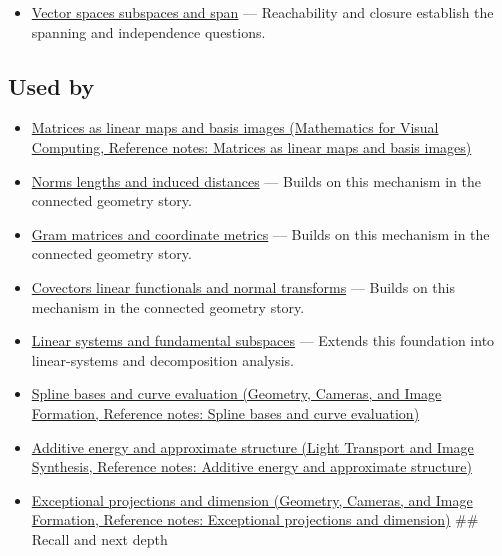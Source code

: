 \begin{itemize}
\tightlist
\item
  \hyperref[appendix-173b52c063ae]{Vector spaces subspaces and span} --- Reachability and closure establish the spanning and independence questions.
\end{itemize}

\subsection{Used by}\label{appendix-ce0341f7ea0d-used-by}

\hypertarget{appendix-ce0341f7ea0d-used-by}{}

\begin{itemize}
\item
  \href{../02-Mathematics-for-Visual-Computing/main.pdf\#nameddest=appendix-bd39c3bf5d64}{Matrices as linear maps and basis images (Mathematics for Visual Computing, Reference notes: Matrices as linear maps and basis images)}
\item
  \hyperref[appendix-49933872bb51]{Norms lengths and induced distances} --- Builds on this mechanism in the connected geometry story.
\item
  \hyperref[appendix-3b863809f82a]{Gram matrices and coordinate metrics} --- Builds on this mechanism in the connected geometry story.
\item
  \hyperref[appendix-46da295c6787]{Covectors linear functionals and normal transforms} --- Builds on this mechanism in the connected geometry story.
\item
  \hyperref[appendix-8572a4a060c1]{Linear systems and fundamental subspaces} --- Extends this foundation into linear-systems and decomposition analysis.
\item
  \href{../03-Geometry-Cameras-and-Image-Formation/main.pdf\#nameddest=appendix-f28eeec97a3d}{Spline bases and curve evaluation (Geometry, Cameras, and Image Formation, Reference notes: Spline bases and curve evaluation)}
\item
  \href{../04-Light-Transport-and-Image-Synthesis/main.pdf\#nameddest=appendix-b0732b22e7d6}{Additive energy and approximate structure (Light Transport and Image Synthesis, Reference notes: Additive energy and approximate structure)}
\item
  \href{../03-Geometry-Cameras-and-Image-Formation/main.pdf\#nameddest=appendix-3c73f7862157}{Exceptional projections and dimension (Geometry, Cameras, and Image Formation, Reference notes: Exceptional projections and dimension)} \#\# Recall and next depth
\end{itemize}

